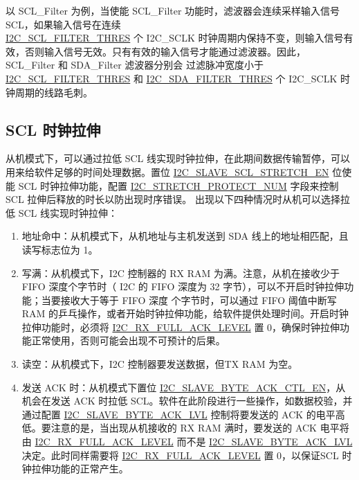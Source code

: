 \documentclass[main\_\_CN.tex]{subfiles}
\begin{document}
以 SCL\_Filter 为例，当使能 SCL\_Filter 功能时，滤波器会连续采样输入信号 SCL，如果输入信号在连续 \\\hyperref[fielddesc:I2CSCLFILTERTHRES]{I2C\_SCL\_FILTER\_THRES} 个 I2C\_SCLK 时钟周期内保持不变，则输入信号有效，否则输入信号无效。只有有效的输入信号才能通过滤波器。因此，SCL\_Filter 和 SDA\_Filter 滤波器分别会
过滤脉冲宽度小于 \hyperref[fielddesc:I2CSCLFILTERTHRES]{I2C\_SCL\_FILTER\_THRES} 和 \hyperref[fielddesc:I2CSDAFILTERTHRES]{I2C\_SDA\_FILTER\_THRES} 个 I2C\_SCLK 时钟周期的线路毛刺。

\subsection{SCL 时钟拉伸}
从机模式下，可以通过拉低 SCL 线实现时钟拉伸，在此期间数据传输暂停，可以用来给软件足够的时间处理数据。置位 \hyperref[fielddesc:I2CSLAVESCLSTRETCHEN]{I2C\_SLAVE\_SCL\_STRETCH\_EN} 位使能 SCL 时钟拉伸功能，配置 \hyperref[fielddesc:I2CSTRETCHPROTECTNUM]{I2C\_STRETCH\_PROTECT\_NUM} 字段来控制 SCL 拉伸后释放的时长以防出现时序错误。
出现以下四种情况时从机可以选择拉低 SCL 线实现时钟拉伸：

\begin{enumerate}
\item 地址命中：从机模式下，从机地址与主机发送到 SDA 线上的地址相匹配，且读写标志位为 1。
\item 写满：从机模式下，I2C 控制器的 RX RAM 为满。注意，从机在接收少于 FIFO 深度个字节时（\chipseries{} I2C 的 FIFO 深度为 32 字节），可以不开启时钟拉伸功能；当要接收大于等于 FIFO 深度 个字节时，可以通过 FIFO 阈值中断写 RAM 的乒乓操作，或者开始时钟拉伸功能，给软件提供处理时间。开启时钟拉伸功能时，必须将 \hyperref[fielddesc:I2CRXFULLACKLEVEL]{I2C\_RX\_FULL\_ACK\_LEVEL} 置 0，确保时钟拉伸功能正常使用，否则可能会出现不可预计的后果。
\item 读空：从机模式下，I2C 控制器要发送数据，但TX RAM 为空。
\item 发送 ACK 时：从机模式下置位 \hyperref[fielddesc:I2CSLAVEBYTEACKCTLEN]{I2C\_SLAVE\_BYTE\_ACK\_CTL\_EN}，从机会在发送 ACK 时拉低 SCL。软件在此阶段进行一些操作，如数据校验，并通过配置 \hyperref[fielddesc:I2CSLAVEBYTEACKLVL]{I2C\_SLAVE\_BYTE\_ACK\_LVL} 控制将要发送的 ACK 的电平高低。要注意的是，当出现从机接收的 RX RAM 满时，要发送的 ACK 电平将由 \hyperref[fielddesc:I2CRXFULLACKLEVEL]{I2C\_RX\_FULL\_ACK\_LEVEL} 而不是 \hyperref[fielddesc:I2CSLAVEBYTEACKLVL]{I2C\_SLAVE\_BYTE\_ACK\_LVL} 决定。此时同样需要将 \hyperref[fielddesc:I2CRXFULLACKLEVEL]{I2C\_RX\_FULL\_ACK\_LEVEL} 置 0，以保证SCL 时钟拉伸功能的正常产生。
\end{enumerate}
\end{document}

